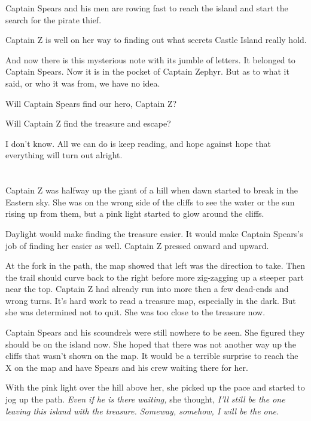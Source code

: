 \documentclass[12pt]{extbook}
\begin{document}
  Captain Spears and his men are rowing fast to reach the island and start
  the search for the pirate thief.
  
  Captain Z is well on her way to finding out what secrets Castle Island
  really hold.
  
  And now there is this mysterious note with its jumble of letters. It
  belonged to Captain Spears. Now it is in the pocket of Captain Zephyr.
  But as to what it said, or who it was from, we have no idea.
  
  Will Captain Spears find our hero, Captain Z?
  
  Will Captain Z find the treasure and escape?
  
  I don't know. All we can do is keep reading, and hope against hope that
  everything will turn out alright.
  
  \section{}\label{section-16}
  
  Captain Z was halfway up the giant of a hill when dawn started to break
  in the Eastern sky. She was on the wrong side of the cliffs to see the
  water or the sun rising up from them, but a pink light started to glow
  around the cliffs.
  
  Daylight would make finding the treasure easier. It would make Captain
  Spears's job of finding her easier as well. Captain Z pressed onward and
  upward.
  
  At the fork in the path, the map showed that left was the direction to
  take. Then the trail should curve back to the right before more
  zig-zagging up a steeper part near the top. Captain Z had already run
  into more then a few dead-ends and wrong turns. It's hard work to read a
  treasure map, especially in the dark. But she was determined not to
  quit. She was too close to the treasure now.
  
  Captain Spears and his scoundrels were still nowhere to be seen. She
  figured they should be on the island now. She hoped that there was not
  another way up the cliffs that wasn't shown on the map. It would be a
  terrible surprise to reach the X on the map and have Spears and his crew
  waiting there for her.
  
  With the pink light over the hill above her, she picked up the pace and
  started to jog up the path. \emph{Even if he is there waiting,} she
  thought, \emph{I'll still be the one leaving this island with the
  treasure. Someway, somehow, I will be the one.}
  
\end{document}
